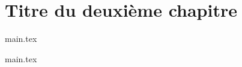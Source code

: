 \chapter{Titre du deuxième chapitre}%
\label{chap:label-chapitre-2}

{main.tex}

\clearpage
{main.tex}

